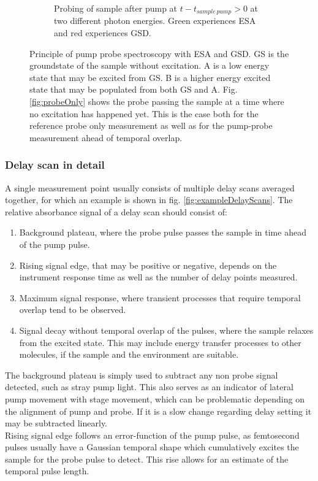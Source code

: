 \documentclass[twoside,openright]{scrreprt}
\begin{document}
\begin{figure}[hbtp]
\begin{subfigure}[t]{0.3\textwidth}
\caption{Probing of sample  after pump at $t-t_{sample\, pump} > 0$ at two different photon energies. Green experiences ESA and red experiences GSD.\label{fig:probeAfterPump}}
\end{subfigure}
\caption{Principle of pump probe spectroscopy with ESA and GSD. GS is the groundstate of the sample without excitation. A is a low energy state that may be excited from GS. B is a higher energy excited state that may be populated from both GS and A. Fig. \ref{fig:probeOnly} shows the probe passing the sample at a time where no excitation has happened yet. This is the case both for the reference probe only measurement as well as for the pump-probe measurement ahead of temporal overlap.\label{fig:CompendiumTA}}
\end{figure}

\subsubsection{Delay scan in detail}
A single measurement point usually consists of multiple delay scans averaged together, for which an example is shown in fig. \ref{fig:exampleDelayScans}. The relative absorbance signal of a delay scan should consist of:
\begin{enumerate}
\item Background plateau, where the probe pulse passes the sample in time ahead of the pump pulse.
\item Rising signal edge, that may be positive or negative, depends on the instrument response time as well as the number of delay points measured.
\item Maximum signal response, where transient processes that require temporal overlap tend to be observed.
\item Signal decay without temporal overlap of the pulses, where the sample relaxes from the excited state. This may include energy transfer processes to other molecules, if the sample and the environment are suitable.
\end{enumerate}
The background plateau is simply used to subtract any non probe signal detected, such as stray pump light. This also serves as an indicator of lateral pump movement with stage movement, which can be problematic depending on the alignment of pump and probe. If it is a slow change regarding delay setting it may be subtracted linearly.\\
Rising signal edge follows an error-function of the pump pulse, as femtosecond pulses usually have a Gaussian temporal shape which cumulatively excites the sample for the probe pulse to detect. This rise allows for an estimate of the temporal pulse length.
\end{document}
